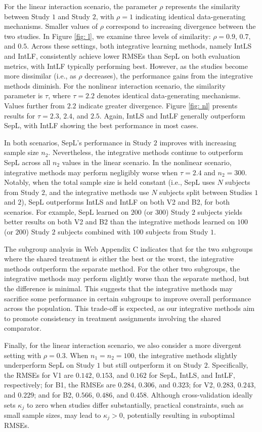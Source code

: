 \documentclass[12pt]{article}
\begin{document}
For the linear interaction scenario, the parameter $\rho$ represents the similarity between Study $1$ and Study $2$, with $\rho=1$ indicating identical data-generating mechanisms. Smaller values of $\rho$ correspond to increasing divergence between the two studies. In Figure \ref{fig: l}, we examine three levels of similarity: $\rho = 0.9$, $0.7$, and $0.5$. Across these settings, both integrative learning methods, namely IntLS and IntLF, consistently achieve lower RMSEs than SepL on both evaluation metrics, with IntLF typically performing best. However, as the studies become more dissimilar (i.e., as $\rho$ decreases), the performance gains from the integrative methods diminish. For the nonlinear interaction scenario, the similarity parameter is $\tau$, where $\tau=2.2$ denotes identical data-generating mechanisms. Values further from $2.2$ indicate greater divergence. Figure \ref{fig: nl} presents results for $\tau = 2.3$, $2.4$, and $2.5$. Again, IntLS and IntLF generally outperform SepL, with IntLF showing the best performance in most cases.

In both scenarios, SepL's performance in Study $2$ improves with increasing sample size $n_2$. Nevertheless, the integrative methods continue to outperform SepL across all $n_2$ values in the linear scenario. In the nonlinear scenario, integrative methods may perform negligibly worse when $\tau=2.4$ and $n_2=300$. Notably, when the total sample size is held constant (i.e., SepL uses $N$ subjects from Study $2$, and the integrative methods use $N$ subjects split between Studies $1$ and $2$), SepL outperforms IntLS and IntLF on both V2 and B2, for both scenarios. For example, SepL learned on $200$ (or $300$) Study $2$ subjects yields better results on both V2 and B2 than the integrative methods learned on $100$ (or $200$) Study $2$ subjects combined with $100$ subjects from Study $1$.

The subgroup analysis in Web Appendix C indicates that for the two subgroups where the shared treatment is either the best or the worst, the integrative methods outperform the separate method. For the other two subgroups, the integrative methods may perform slightly worse than the separate method, but the difference is minimal. This suggests that the integrative methods may sacrifice some performance in certain subgroups to improve overall performance across the population. This trade-off is expected, as our integrative methods aim to promote consistency in treatment assignments involving the shared comparator.

Finally, for the linear interaction scenario, we also consider a more divergent setting with $\rho = 0.3$. When $n_1=n_2=100$, the integrative methods slightly underperform SepL on Study $1$ but still outperform it on Study $2$. Specifically, the RMSEs for V1 are $0.142$, $0.153$, and $0.162$ for SepL, IntLS, and IntLF, respectively; for B1, the RMSEs are $0.284$, $0.306$, and $0.323$; for V2, $0.283$, $0.243$, and $0.229$; and for B2, $0.566$, $0.486$, and $0.458$. Although cross-validation ideally sets $\kappa_j$ to zero when studies differ substantially, practical constraints, such as small sample sizes, may lead to $\kappa_j>0$, potentially resulting in suboptimal RMSEs.
\end{document}
